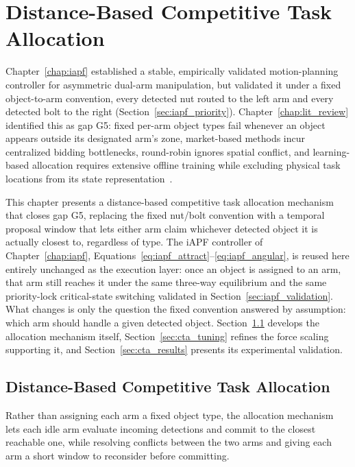 \chapter{Distance-Based Competitive Task Allocation}
\label{chap:task_allocation}

Chapter~\ref{chap:iapf} established a stable, empirically validated motion-planning controller for
asymmetric dual-arm manipulation, but validated it under a fixed object-to-arm convention, every
detected nut routed to the left arm and every detected bolt to the right
(Section~\ref{sec:iapf_priority}). Chapter~\ref{chap:lit_review} identified this as gap G5: fixed
per-arm object types fail whenever an object appears outside its designated arm's zone, market-based
methods incur centralized bidding bottlenecks, round-robin ignores spatial conflict, and
learning-based allocation requires extensive offline training while excluding physical task
locations from its state representation~\citep{sk2025competitive}.

This chapter presents a distance-based competitive task allocation mechanism that closes gap G5,
replacing the fixed nut/bolt convention with a temporal proposal window that lets either arm claim
whichever detected object it is actually closest to, regardless of type. The iAPF controller of
Chapter~\ref{chap:iapf}, Equations~\eqref{eq:iapf_attract}--\eqref{eq:iapf_angular}, is reused here
entirely unchanged as the execution layer: once an object is assigned to an arm, that arm still
reaches it under the same three-way equilibrium and the same priority-lock critical-state switching
validated in Section~\ref{sec:iapf_validation}. What changes is only
the question the fixed convention answered by assumption: which arm should handle a given detected
object. Section~\ref{sec:cta_allocation} develops the allocation mechanism itself,
Section~\ref{sec:cta_tuning} refines the force scaling supporting it, and
Section~\ref{sec:cta_results} presents its experimental validation.

\section{Distance-Based Competitive Task Allocation}\label{sec:cta_allocation}

Rather than assigning each arm a fixed object type, the allocation mechanism lets each idle arm
evaluate incoming detections and commit to the closest reachable one, while resolving conflicts
between the two arms and giving each arm a short window to reconsider before committing.

